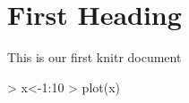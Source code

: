 \documentclass{article}
\begin{document}


\section{First Heading}
This is our first knitr document

\begin{Schunk}
\begin{Sinput}
> x<-1:10
> plot(x)
\end{Sinput}
\end{Schunk}
\end{document}
